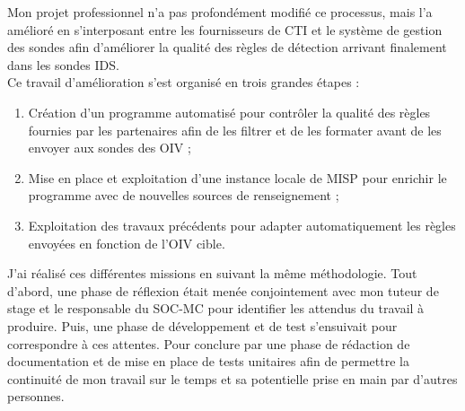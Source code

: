 Mon projet professionnel n'a pas profondément modifié ce processus, mais l'a amélioré en s'interposant entre les fournisseurs de CTI et le système de gestion des sondes afin d'améliorer la qualité des règles de détection arrivant finalement dans les sondes IDS.\\

Ce travail d'amélioration s'est organisé en trois grandes étapes :\\

\begin{enumerate}[itemsep=1em]
    \item Création d'un programme automatisé pour contrôler la qualité des règles fournies par les partenaires afin de les filtrer et de les formater avant de les envoyer aux sondes des OIV ;
    \item Mise en place et exploitation d'une instance locale de MISP pour enrichir le programme avec de nouvelles sources de renseignement ;
    \item Exploitation des travaux précédents pour adapter automatiquement les règles envoyées en fonction de l'OIV cible.\\
\end{enumerate}

J'ai réalisé ces différentes missions en suivant la même méthodologie. Tout d'abord, une phase de réflexion était menée conjointement avec mon tuteur de stage et le responsable du SOC-MC pour identifier les attendus du travail à produire. Puis, une phase de développement et de test s'ensuivait pour correspondre à ces attentes. Pour conclure par une phase de rédaction de documentation et de mise en place de tests unitaires afin de permettre la continuité de mon travail sur le temps et sa potentielle prise en main par d'autres personnes.